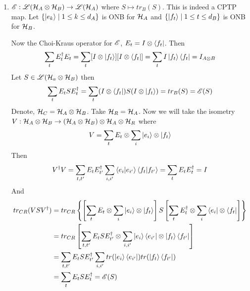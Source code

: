 \documentclass[a4paper, 11pt]{article}
\begin{document}
{\begin{enumerate}[label=(\arabic*)]
	$$V^{\dagger}V= \sum_{t,t'}E_t^{\dagger}E_{t'}\sum_{i,i'}\bra{e_i}\ket{e_{i'}}\bra{g_t}\ket{g_{t'}}=\sum_tE_t^{\dagger}E_t=I$$Now \begin{align*}
		tr_{RA}(VSV^{\dagger}) & = tr_{RA}\lt\{   \lt[\sum_{t}E_t\tensor \sum_{i}\ket{e_i}\tensor \ket{g_t}\rt]S\lt[\sum_{t}E_t^{\dagger}\tensor \sum_{i}\bra{e_i}\tensor \bra{g_t}\rt]  \rt\}                                                            \\
		                       & =tr_{RA}\lt\{   \sum_{t,t'}E_tSE_{t'}^{\dagger}\tensor \sum_{i,i'}\bra{e_i}\ket{e_{i'}}\tensor \bra{g_t}\ket{g_{t'}} \rt\}                                                      \\
		                       & =  \sum_{t,t'}E_tSE_{t'}^{\dagger}\sum_{i,i'}tr(\bra{e_i}\ket{e_{i'}})tr(\bra{g_t}\ket{g_{t'}})\\
		                       & = \sum_tE_tSE_t^{\dagger}=\sE(S)
	\end{align*}
	
	
	
	\item ${\mathscr{E}}:{\mathscr{L}}(\mathcal{H}_A\otimes \mathcal{H}_B)\to {\mathscr{L}}(\mathcal{H}_A)$ where $S\mapsto tr_B(S)$. This is indeed a CPTP map. Let $\{\ket{e_k}\mid 1\leq k\leq d_A\}$ is ONB for $\mathcal{H}_A$ and $\{\ket{f_t}\mid 1\leq t\leq d_B\}$ is ONB for $\mathcal{H}_B$. 
	
	Now the Choi-Kraus operator for ${\mathscr{E}}$, $E_t=I\otimes \bra{f_t}$. Then $$\sum_{t}E_t^{\dagger}E_t=\sum_{t}[I\otimes \ket{f_t}][I\otimes \bra{f_t}]=\sum_tI\ket{f_t}\bra{f_t}=I_{A\otimes B}$$Let $S\in {\mathscr{L}}(\mathcal{H}_a\otimes \mathcal{H}_B)$ then $$\sum_{t}E_tSE_t^{\dagger}=\sum_t(I\otimes \bra{f_t})S(I\otimes \ket{f_t})=tr_B(S)={\mathscr{E}}(S)$$Denote, $\mathcal{H}_C=\mathcal{H}_A\otimes \mathcal{H}_B$. Take $\mathcal{H}_R=\mathcal{H}_A$. Now we will take  the isometry $V:\mathcal{H}_A\otimes \mathcal{H}_B\to(\mathcal{H}_A\otimes \mathcal{H}_B)\otimes \mathcal{H}_A\otimes \mathcal{H}_R$ where $$V=\sum_tE_t\otimes \sum_i\ket{e_i}\otimes \ket{f_t}$$ Then $$V^{\dagger}V=\sum_{t,t'}E_tE_{t'}^{\dagger}\sum_{i,i'}\bra{e_i}\ket{e_{i'}}\bra{f_t}\ket{f_{t'}}=\sum_tE_tE^{\dagger}_t=I$$And \begin{align*}
		tr_{CR}(VSV^{\dagger}) & = tr_{CR}\left\{  \left[\sum_tE_t\otimes \sum_i\ket{e_i}\otimes \ket{f_t}\right]S\left[ \sum_tE_t^{\dagger}\otimes \sum_i\bra{e_i}\otimes \bra{f_t}\right]   \right\}\\
		& = 	 tr_{CR}\left[\sum_{t,t'}E_tSE_{t'}^{\dagger}\otimes \sum_{i,i'}\ket{e_i}\bra{e_{i'}}\otimes \ket{f_t}\bra{f_{t'}}\right]\\
		& = \sum_{t,t'} E_tSE_{t'}^{\dagger}\sum_{i,i'}tr(\ket{e_i}\bra{e_{i'}}) tr(\ket{f_t}\bra{f_{t'}})\\
		& = \sum_tE_tSE_t^{\dagger}={\mathscr{E}}(S)
	\end{align*}
	

\end{enumerate}}
\end{document}
